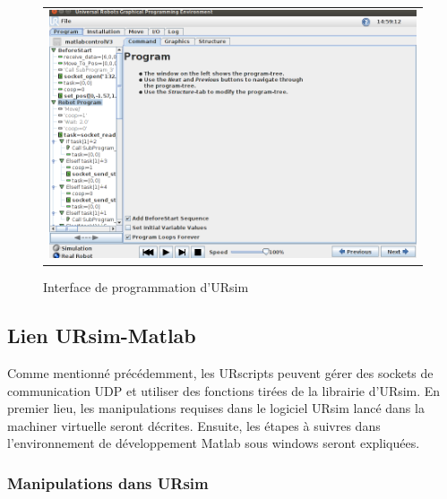 \begin{figure}
 \begin{center}
  \begin{tabular}{c}
    \includegraphics[trim=0cm 0cm 0cm 0cm, scale=0.35]{screenshots_tuto_ursim/interface_prog.png}
  \end{tabular}
 \end{center}
\caption{Interface de programmation d'URsim}
 \label{fig:ui_programmation}
\end{figure}



\subsection{Lien URsim-Matlab}
Comme mentionné précédemment, les URscripts peuvent gérer des sockets de communication UDP et utiliser des fonctions tirées de la librairie d'URsim. 
En premier lieu, les manipulations requises dans le logiciel URsim lancé dans la machiner virtuelle seront décrites.
Ensuite, les étapes à suivres dans l'environnement de développement Matlab sous windows seront expliquées.

\subsubsection{Manipulations dans URsim}

